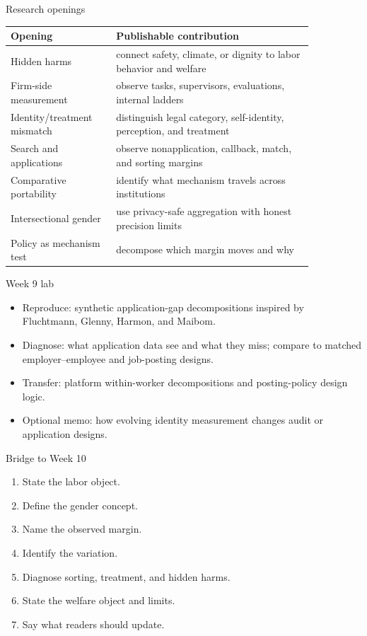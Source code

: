 \documentclass[aspectratio=169,11pt]{beamer}
\begin{document}
\begin{frame}{Research openings}
\scriptsize
\begin{tabular}{p{0.29\linewidth} p{0.56\linewidth}}
\toprule
Opening & Publishable contribution \\
\midrule
Hidden harms & connect safety, climate, or dignity to labor behavior and welfare \\
Firm-side measurement & observe tasks, supervisors, evaluations, internal ladders \\
Identity/treatment mismatch & distinguish legal category, self-identity, perception, and treatment \\
Search and applications & observe nonapplication, callback, match, and sorting margins \\
Comparative portability & identify what mechanism travels across institutions \\
Intersectional gender & use privacy-safe aggregation with honest precision limits \\
Policy as mechanism test & decompose which margin moves and why \\
\bottomrule
\end{tabular}
\end{frame}

\begin{frame}{Week 9 lab}
\begin{itemize}
    \item Reproduce: synthetic application-gap decompositions inspired by Fluchtmann, Glenny, Harmon, and Maibom.
    \item Diagnose: what application data see and what they miss; compare to matched employer--employee and job-posting designs.
    \item Transfer: platform within-worker decompositions and posting-policy design logic.
    \item Optional memo: how evolving identity measurement changes audit or application designs.
\end{itemize}
\end{frame}

\begin{frame}{Bridge to Week 10}
\begin{enumerate}
    \item State the labor object.
    \item Define the gender concept.
    \item Name the observed margin.
    \item Identify the variation.
    \item Diagnose sorting, treatment, and hidden harms.
    \item State the welfare object and limits.
    \item Say what readers should update.
\end{enumerate}
\end{frame}
\end{document}
